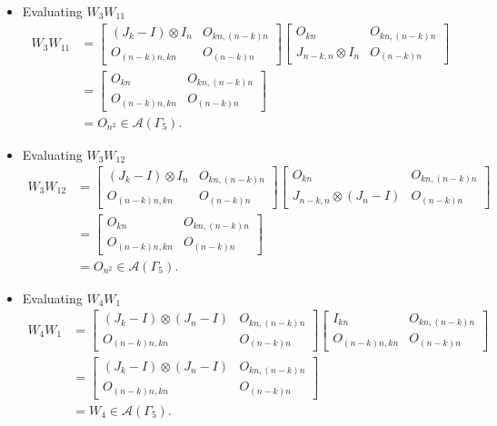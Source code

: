 \begin{itemize}
\item Evaluating $W_{3}W_{11}$
\begin{align*}
W_3W_{11} &=
\begin{bmatrix}
(J_k - I) \otimes I_n & O_{kn, (n-k)n} \\
O_{(n-k)n,kn} & O_{(n-k)n}
\end{bmatrix}
\begin{bmatrix}
O_{kn} & O_{kn,(n-k)n} \\
J_{n-k,n}\otimes I_n & O_{(n-k)n}
\end{bmatrix}\\
&= \begin{bmatrix}
O_{kn} & O_{kn,(n-k)n} \\
O_{(n-k)n,kn} & O_{(n-k)n}
\end{bmatrix}\\
&= O_{n^2}\in\mathcal{A}(\Gamma_5).
\end{align*}

\item Evaluating $W_{3}W_{12}$
\begin{align*}
W_3W_{12} &=
\begin{bmatrix}
(J_k - I) \otimes I_n & O_{kn, (n-k)n} \\
O_{(n-k)n,kn} & O_{(n-k)n}
\end{bmatrix}
\begin{bmatrix}
O_{kn} & O_{kn,(n-k)n} \\
J_{n-k,n}\otimes (J_n-I) & O_{(n-k)n}
\end{bmatrix}\\
&= \begin{bmatrix}
O_{kn} & O_{kn,(n-k)n} \\
O_{(n-k)n,kn} & O_{(n-k)n}
\end{bmatrix}\\
&= O_{n^2}\in\mathcal{A}(\Gamma_5).
\end{align*}

\item Evaluating $W_{4}W_{1}$
\begin{align*}
W_4W_1 &=
\begin{bmatrix}
(J_k - I) \otimes (J_n - I) & O_{kn, (n-k)n} \\
O_{(n-k)n,kn} & O_{(n-k)n}
\end{bmatrix}
\begin{bmatrix}
I_{kn} & O_{kn, (n-k)n} \\
O_{(n-k)n,kn} & O_{(n-k)n}
\end{bmatrix}\\
&= \begin{bmatrix}
(J_k - I) \otimes (J_n - I) & O_{kn, (n-k)n} \\
O_{(n-k)n,kn} & O_{(n-k)n}
\end{bmatrix}\\
&= W_4 \in\mathcal{A}(\Gamma_5).
\end{align*}


\end{itemize}
